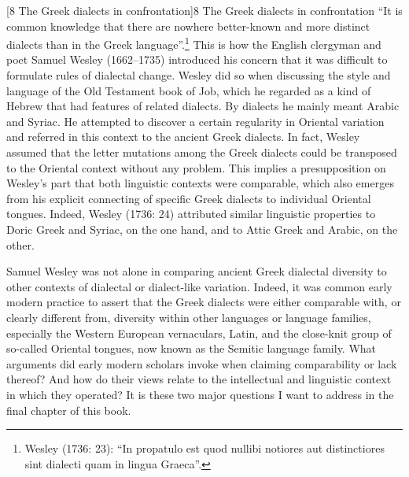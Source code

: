 \documentclass[12pt]{article}
\makeatletter
\renewcommand\section{\@startsection{section}{1}{0.0in}{0.1665in}{0.0835in}{\normalfont\normalsize\fontsize{14pt}{16.8pt}\selectfont\rmfamily\bfseries}}
\newenvironment{styleStandard}{\renewcommand\baselinestretch{1.25}\setlength\leftskip{0in}\setlength\rightskip{0in}\setlength\parindent{0.1972in}\setlength\parfillskip{0pt plus 1fil}\setlength\parskip{0in plus 1pt}\writerlistparindent\writerlistleftskip\leavevmode\normalfont\normalsize\writerlistlabel\ignorespaces}{\unskip\vspace{0in plus 1pt}\par}
\newcommand\writerlistleftskip{}
\newcommand\writerlistparindent{}
\newcommand\writerlistlabel{}
\makeatother
\begin{document}
\clearpage\clearpage\section[8 The Greek dialects in confrontation]{\textsc{8 }The Greek dialects in confrontation}
\hypertarget{Toc19704857}{}\begin{styleStandard}
“It is common knowledge that there are nowhere better-known and more distinct dialects than in the Greek language”.\footnote{ Wesley (1736: 23): “In propatulo est quod nullibi notiores aut distinctiores sint dialecti quam in lingua Graeca”.} This is how the English clergyman and poet Samuel Wesley (1662–1735) introduced his concern that it was difficult to formulate rules of dialectal change. Wesley did so when discussing the style and language of the Old Testament book of Job, which he regarded as a kind of Hebrew that had features of related dialects. By dialects he mainly meant Arabic and Syriac. He attempted to discover a certain regularity in Oriental variation and referred in this context to the ancient Greek dialects. In fact, Wesley assumed that the letter mutations among the Greek dialects could be transposed to the Oriental context without any problem. This implies a presupposition on Wesley’s part that both linguistic contexts were comparable, which also emerges from his explicit connecting of specific Greek dialects to individual Oriental tongues. Indeed, Wesley (1736: 24) attributed similar linguistic properties to Doric Greek and Syriac, on the one hand, and to Attic Greek and Arabic, on the other.
\end{styleStandard}

\begin{styleStandard}
Samuel Wesley was not alone in comparing ancient Greek dialectal diversity to other contexts of dialectal or dialect-like variation. Indeed, it was common early modern practice to assert that the Greek dialects were either comparable with, or clearly different from, diversity within other languages or language families, especially the Western European vernaculars, Latin, and the close-knit group of so-called Oriental tongues, now known as the Semitic language family. What arguments did early modern scholars invoke when claiming comparability or lack thereof? And how do their views relate to the intellectual and linguistic context in which they operated? It is these two major questions I want to address in the final chapter of this book.
\end{styleStandard}
\end{document}
